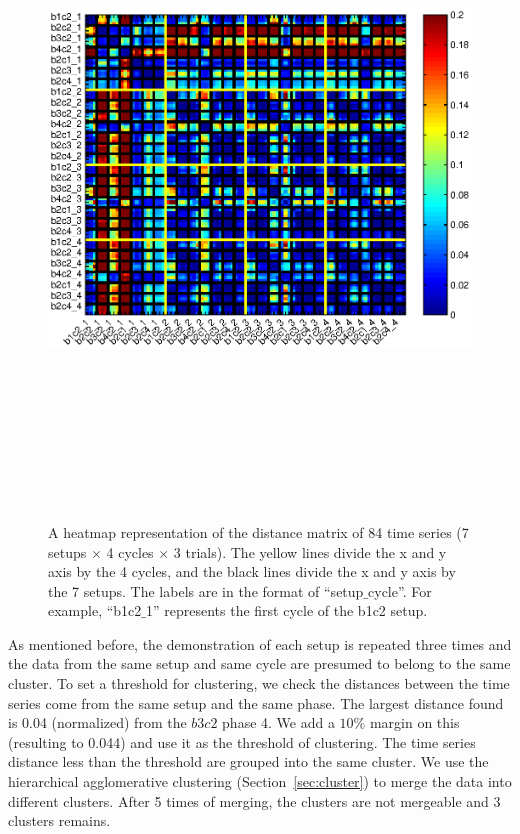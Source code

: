 \begin{figure}
\label{heatmap}
  \centering
  \includegraphics[width=18cm,height=18cm]{./fig/heatmap_all6.eps}
  \caption{ \scriptsize{A heatmap representation of the distance matrix of 84 time series (7 setups $\times$ 4 cycles $\times$ 3 trials). The yellow lines divide the x and y axis by the 4 cycles, and the black lines divide the x and y axis by the 7 setups. The labels are in the format of ``setup$\_$cycle''. For example, ``b1c2$\_$1'' represents the first cycle of the b1c2 setup.}
}
\label{fig:heatmap}
\end{figure}

As mentioned before, the demonstration of each setup is repeated three times and the data from the same setup and same cycle are presumed to belong to the same cluster. To set a threshold for clustering, we check the distances between the time series come from the same setup and the same phase. The largest distance found is 0.04 (normalized) from the $b3c2$ phase 4. We add a $10\%$ margin on this (resulting to 0.044) and use it as the threshold of clustering. The time series distance less than the threshold are grouped into the same cluster. We use the hierarchical agglomerative clustering (Section~\ref{sec:cluster}) to merge the data into different clusters. After 5 times of merging, the clusters are not mergeable and 3 clusters remains.

